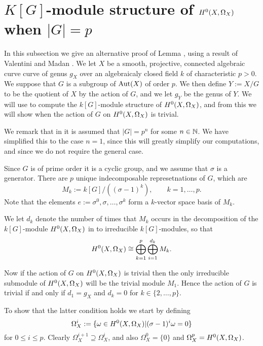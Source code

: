 \section{$K[G]$-module structure of ${H^0(X,\Omega_X)}$ when $|G|=p$}

In this subsection we give an alternative proof of Lemma , using a result of Valentini and Madan \cite{valmadan}.
We let $X$ be a smooth, projective, connected algebraic curve curve of genus $g_X$ over an algebraicaly closed field $k$ of characteristic $p >0$.
We suppose that $G$ is a subgroup of $\operatorname{Aut}(X)$ of order $p$.
We then define $Y:= X/G$ to be the quotient of $X$ by the action of $G$, and we let $g_Y$ be the genus of $Y$.
We will use \cite[Thm.\ 1]{valmadan} to compute the $k[G]$-module structure of ${H^0(X,\Omega_X)}$, and from this we will show when the action of $G$ on ${H^0(X,\Omega_X)}$ is trivial.

We remark that in \cite{valmadan} it is assumed that $|G|=p^n$ for some $n \in {\mathbb N}$.
We have simplified this to the case $n=1$, since this will greatly simplify our computations, and since we do not require the general case.

Since $G$ is of prime order it is a cyclic group, and we assume that $\sigma$ is a generator.
There are $p$ unique indecomposable represetnations of $G$, which are 
    \[
    M_k := k[G]/((\sigma - 1)^k), \qquad k = 1, \ldots, p.
    \]
Note that the elements $e:= \sigma^0, \sigma, \ldots, \sigma^k$ form a $k$-vector space basis of $M_k$.

We let $d_k$ denote the number of times that $M_k$ occurs in the decomposition of the $k[G]$-module ${H^0(X,\Omega_X)}$ in to irreducible $k[G]$-modules, so that
    \begin{equation}\label{equationdecompositionofhzero}
    {H^0(X,\Omega_X)} \cong \bigoplus_{k=1}^p \bigoplus_{i=1}^{d_k} M_k.
    \end{equation}

Now if the action of $G$ on ${H^0(X,\Omega_X)}$ is trivial then the only irreducible submodule of ${H^0(X,\Omega_X)}$ will be the trivial module $M_1$.
Hence the action of $G$ is trivial if and only if $d_1 = g_X$ and $d_k = 0$ for $k \in \{ 2, \ldots, p \}$.

To show that the latter condition holds we start by defining
    \[
    \Omega_X^i := \{ \omega \in {H^0(X,\Omega_X)} | (\sigma - 1)^i\omega = 0 \}
    \]
for $0 \leq i \leq p$.
Clearly $\Omega_X^{i+1} \supseteq \Omega_X^i$, and also $\Omega_X^0 = \{0\}$ and $\Omega_X^p = {H^0(X,\Omega_X)}$.

